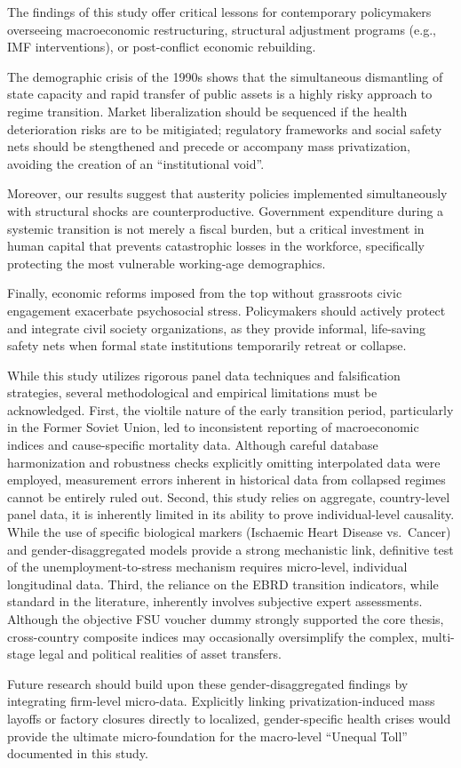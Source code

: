 \documentclass[12pt]{article}
\begin{document}
The findings of this study offer critical lessons for contemporary policymakers overseeing macroeconomic restructuring, structural adjustment programs (e.g., IMF interventions), or post-conflict economic 
rebuilding. 

The demographic crisis of the 1990s shows that the simultaneous dismantling of state capacity and rapid transfer of public assets is a highly risky approach to regime transition. 
    Market liberalization should be sequenced if the health deterioration risks are to be mitigiated; regulatory frameworks and social safety nets should be stengthened and precede or accompany mass privatization, avoiding the creation of an ``institutional void''.

Moreover, our results suggest that austerity policies implemented simultaneously with structural shocks are counterproductive. Government expenditure during a systemic transition is 
    not merely a fiscal burden, but a critical investment in human capital that prevents catastrophic losses in the workforce, specifically protecting the most vulnerable working-age demographics.
    
 Finally, economic reforms imposed from the top  without grassroots civic engagement exacerbate psychosocial stress. Policymakers should actively protect and integrate 
    civil society organizations, as they provide informal, life-saving safety nets when formal state institutions temporarily retreat or collapse.

While this study utilizes rigorous panel data techniques and falsification strategies, several methodological and empirical limitations must be acknowledged. First, the violtile nature of the early transition period, particularly in the Former Soviet Union, led to inconsistent reporting of macroeconomic indices
    and cause-specific mortality data. Although careful database harmonization and robustness checks explicitly omitting interpolated data were employed, measurement errors inherent in historical data from 
    collapsed regimes cannot be entirely ruled out. Second, this study relies on aggregate, country-level panel data, it is inherently limited in its ability to prove individual-level causality. While the use 
    of specific biological markers (Ischaemic Heart Disease vs.\ Cancer) and gender-disaggregated models provide a strong mechanistic link, definitive test of the unemployment-to-stress mechanism requires 
    micro-level, individual longitudinal data. Third, the reliance on the EBRD transition indicators, while standard in the literature, inherently involves subjective expert assessments. Although the 
    objective FSU voucher dummy strongly supported the core thesis, cross-country composite indices may occasionally oversimplify the complex, multi-stage legal and political realities of asset transfers.


Future research should build upon these gender-disaggregated findings by integrating firm-level micro-data. Explicitly linking privatization-induced mass layoffs or factory closures directly to localized, 
gender-specific health crises would provide the ultimate micro-foundation for the macro-level ``Unequal Toll'' documented in this study.

\clearpage 
\singlespacing 
 
\end{document}

